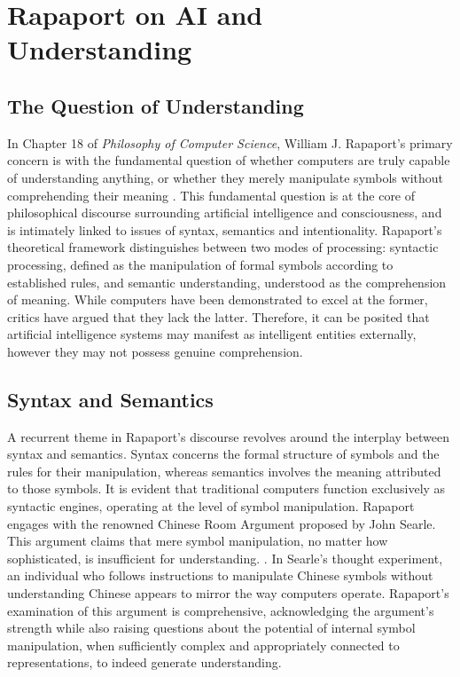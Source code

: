 \documentclass[runningheads]{llncs}
\begin{document}
\section{Rapaport on AI and Understanding}
\subsection{The Question of Understanding}
%
In Chapter 18 of \textit{Philosophy of Computer Science}, William J. Rapaport's primary concern is with the fundamental question of whether computers are truly capable of understanding anything, or whether they merely manipulate symbols without comprehending their meaning \cite{rapaport2005philosophy}. This fundamental question is at the core of philosophical discourse surrounding artificial intelligence and consciousness, and is intimately linked to issues of syntax, semantics and intentionality.
Rapaport's theoretical framework distinguishes between two modes of processing: syntactic processing, defined as the manipulation of formal symbols according to established rules, and semantic understanding, understood as the comprehension of meaning. While computers have been demonstrated to excel at the former, critics have argued that they lack the latter. Therefore, it can be posited that artificial intelligence systems may manifest as intelligent entities externally, however they may not possess genuine comprehension.
%
%
\subsection{Syntax and Semantics}
%
A recurrent theme in Rapaport's discourse revolves around the interplay between syntax and semantics. Syntax concerns the formal structure of symbols and the rules for their manipulation, whereas semantics involves the meaning attributed to those symbols. It is evident that traditional computers function exclusively as syntactic engines, operating at the level of symbol manipulation.
Rapaport engages with the renowned Chinese Room Argument proposed by John Searle. This argument claims that mere symbol manipulation, no matter how sophisticated, is insufficient for understanding. \cite{searle1980minds}. In Searle's thought experiment, an individual who follows instructions to manipulate Chinese symbols without understanding Chinese appears to mirror the way computers operate. Rapaport's examination of this argument is comprehensive, acknowledging the argument's strength while also raising questions about the potential of internal symbol manipulation, when sufficiently complex and appropriately connected to representations, to indeed generate understanding.
%
%
\end{document}
